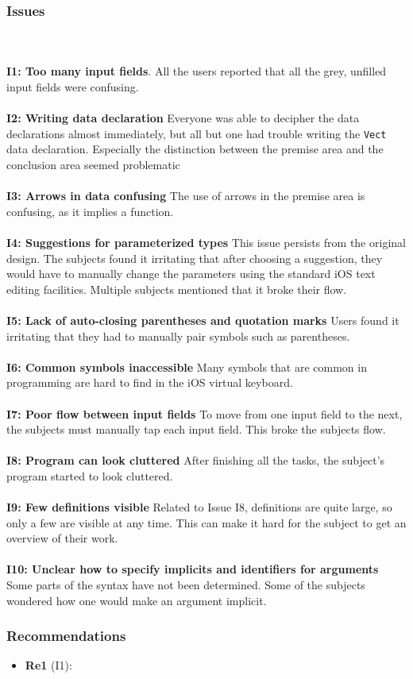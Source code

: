 \subsubsection{Issues}
\label{sec:second_issues}
\\ \\
\textbf{I1: Too many input fields}.
All the users reported that all the grey, unfilled input fields were confusing.
\\ \\
\textbf{I2: Writing data declaration}
Everyone was able to decipher the data declarations almost immediately, but
all but one had trouble writing the \texttt{Vect} data declaration. Especially
the distinction between the premise area and the conclusion area seemed
problematic
\\ \\
\textbf{I3: Arrows in data confusing}
The use of arrows in the premise area is confusing, as it implies a function.
\\ \\
\textbf{I4: Suggestions for parameterized types}
This issue persists from the original design. The subjects found it irritating
that after choosing a suggestion, they would have to manually change the
parameters using the standard iOS text editing facilities. Multiple subjects
mentioned that it broke their flow.
\\ \\
\textbf{I5: Lack of auto-closing parentheses and quotation marks}
Users found it irritating that they had to manually pair symbols such as
parentheses.
\\ \\
\textbf{I6: Common symbols inaccessible}
Many symbols that are common in programming are hard to find in the iOS virtual
keyboard.
\\ \\
\textbf{I7: Poor flow between input fields}
To move from one input field to the next, the subjects must manually tap each
input field. This broke the subjects flow.
\\ \\
\textbf{I8: Program can look cluttered}
After finishing all the tasks, the subject's program started to look cluttered.
\\ \\
\textbf{I9: Few definitions visible}
Related to Issue I8, definitions are quite large, so only a few are visible at
any time. This can make it hard for the subject to get an overview of their
work.
\\ \\
\textbf{I10: Unclear how to specify implicits and identifiers for arguments}
Some parts of the syntax have not been determined. Some of the subjects
wondered how one would make an argument implicit.

\subsubsection{Recommendations}
\label{sec:second_recommendations}
\begin{itemize}
	\item \textbf{Re1} (I1): 
\end{itemize}
